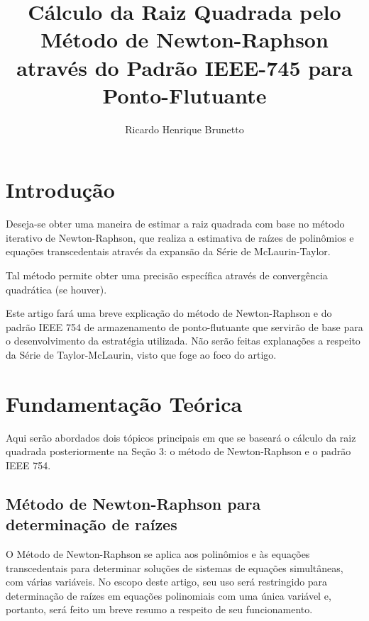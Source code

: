 

\sloppy

\title{Cálculo da Raiz Quadrada pelo Método de Newton-Raphson\\através do Padrão IEEE-745 para Ponto-Flutuante}

\author{Ricardo Henrique Brunetto}


\address{Departamento de Informática -- Universidade Estadual de Maringá (UEM)\\
	Maringá -- PR -- Brasil
}



	\maketitle

  \section{Introdução}
	Deseja-se obter uma maneira de estimar a raiz quadrada com base no método iterativo de Newton-Raphson, que realiza a
	estimativa de raízes de polinômios e equações transcedentais através da expansão da Série de McLaurin-Taylor.

	Tal método permite obter uma precisão específica através de convergência quadrática (se houver).

	Este artigo fará uma breve explicação do método de Newton-Raphson e do padrão IEEE 754 de armazenamento de ponto-flutuante
	que servirão de base para o desenvolvimento da estratégia utilizada. Não serão feitas explanações a respeito da Série de Taylor-McLaurin,
	visto que foge ao foco do artigo.

	\section{Fundamentação Teórica}
	\label{sec:fund_teor}
	Aqui serão abordados dois tópicos principais em que se baseará o cálculo da raiz quadrada posteriormente na Seção 3:
	o método de Newton-Raphson e o padrão IEEE 754.

	\subsection{Método de Newton-Raphson para determinação de raízes}
	O Método de Newton-Raphson se aplica aos polinômios e às equações transcedentais
	para determinar soluções de sistemas de equações simultâneas, com várias variáveis.
	No escopo deste artigo, seu uso será restringido para determinação de raízes em
	equações polinomiais com uma única variável e, portanto, será feito um breve resumo
	a respeito de seu funcionamento.

